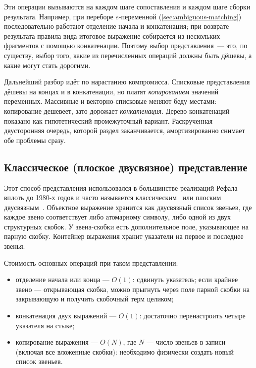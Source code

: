 Эти операции вызываются на каждом шаге сопоставления и каждом шаге сборки
результата. Например, при переборе \(e\)-переменной
(\ref{sec:ambiguous-matching}) последовательно работают отделение начала
и конкатенация; при возврате результата правила вида  итоговое выражение собирается из нескольких фрагментов с помощью
конкатенации. Поэтому выбор представления~--- это, по существу, выбор
того, какие из перечисленных операций должны быть дёшевы, а какие могут
стать дорогими.

Дальнейший разбор идёт по нарастанию компромисса. Списковые представления дёшевы на
концах и в конкатенации, но платят \emph{копированием} значений переменных. Массивные и
векторно-списковые меняют беду местами: копирование дешевеет, зато дорожает
\emph{конкатенация}. Дерево конкатенаций показано как гипотетический промежуточный
вариант. Раскрученная двусторонняя очередь, которой раздел заканчивается, амортизированно
снимает обе проблемы сразу.

\subsection{Классическое (плоское двусвязное) представление}
\label{sec:flat-list}

Этот способ представления использовался в большинстве реализаций Рефала
вплоть до 1980-х годов и часто называется классическим~\cite{skorobogatov_repr}
или плоским двусвязным~\cite{abramov_romanenko_1988}. Объектное
выражение хранится как двусвязный список звеньев, где каждое звено
соответствует либо атомарному символу, либо одной из двух структурных
скобок. У звена-скобки есть дополнительное поле, указывающее на парную
скобку. Контейнер выражения хранит указатели на первое и последнее звенья.

Стоимость основных операций при таком представлении:

\begin{itemize}
  \item отделение начала или конца --- \(O(1)\): сдвинуть указатель; если
        крайнее звено --- открывающая скобка, можно прыгнуть через поле
        парной скобки на закрывающую и получить скобочный терм целиком;
  \item конкатенация двух выражений --- \(O(1)\): достаточно перенастроить
        четыре указателя на стыке;
  \item копирование выражения --- \(O(N)\), где \(N\) --- число
        звеньев в записи (включая все вложенные скобки): необходимо
        физически создать новый список звеньев.
\end{itemize}

